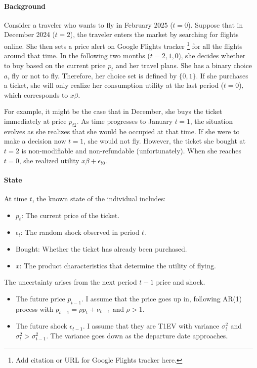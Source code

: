 \documentclass[12pt]{article}
\begin{document}
\paragraph{Background} Consider a traveler who wants to fly in February 2025 (\(t=0\)). Suppose that
in December 2024 (\(t=2\)), the traveler enters the market by searching for
flights online. She then sets a price alert on Google Flights tracker
\footnote{Add citation or URL for Google Flights tracker here.} for all the
flights around that time. In the following two months (\(t = 2, 1,0\)), she
decides whether to buy based on the current price \(p_t\) and her travel plans.
She has a binary choice $a$, fly or not to fly. Therefore, her choice set is
defined by \(\{0,1\}\). If she purchases a ticket, she will only realize her
consumption utility at the last period (\(t=0\)), which corresponds to
\(x\beta\).

For example, it might be the case that in December, she buys the ticket
immediately at price \(p_{t2}\). As time progresses to January $t=1$, the
situation evolves as she realizes that she would be occupied at that time. If
she were to make a decision now $t=1$, she would not fly. However, the ticket
she bought at $t=2$ is non-modifiable and non-refundable (unfortunately). When
she reaches \(t=0\), she realized utility $x\beta+\epsilon_{t0}$.

\paragraph{State} At time \( t \), the known state of the individual includes:
\begin{itemize}
    \item \( p_t \): The current price of the ticket.
    \item \( \epsilon_t \): The random shock observed in period \( t \).
    \item \( \text{Bought}\): Whether the ticket has already been purchased.
    \item \( x \): The product characteristics that determine the utility of flying.
\end{itemize}
The uncertainty arises from the next period \( t-1 \) price and shock.
\begin{itemize}
    \item The future price $p_{t-1}$. I assume that the price goes up in, following AR(1)
          process with $p_{t-1}=\rho p_t + \nu_{t-1}$ and $\rho>1$.
    \item The future shock $\epsilon_{t-1}$. I assume that they are T1EV with variance
          \(\sigma_t^2\) and $\sigma_{t}^2>\sigma_{t-1}^2$. The variance goes down as the
          departure date approaches.
\end{itemize}
\end{document}
